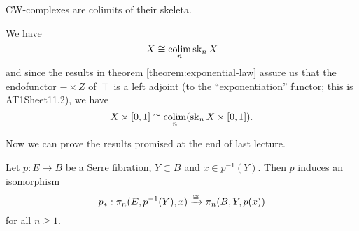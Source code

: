 \begin{remark}
CW-complexes are colimits of their skeleta.

\begin{center}
\end{center}

We have
\[X\cong\operatorname*{colim}_n\operatorname{sk}_n X\]
and since the results in theorem \ref{theorem:exponential-law} assure us that the endofunctor $-\times Z$ of $\Top$ is a left adjoint (to the \enquote{exponentiation} functor; this is AT1Sheet11.2), we have
\[X\times[0,1]\cong\operatorname*{colim}_n(\operatorname{sk}_n X\times[0,1]).\]
\end{remark}

Now we can prove the results promised at the end of last lecture.

\begin{lemma}
Let $p:E\to B$ be a Serre fibration, $Y\subset B$ and $x\in p^{-1}(Y)$. Then $p$ induces an isomorphism
\[p_*:\pi_n(E,p^{-1}(Y),x)\xrightarrow{\cong}\pi_n(B,Y,p(x))\]
for all $n\geq1$.
\end{lemma}

